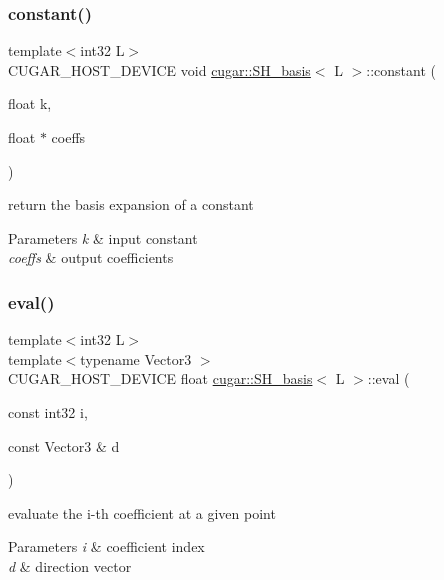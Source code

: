 \subsubsection{\texorpdfstring{constant()}{constant()}}
{\footnotesize\ttfamily template$<$int32 L$>$ \\
C\+U\+G\+A\+R\+\_\+\+H\+O\+S\+T\+\_\+\+D\+E\+V\+I\+CE void \hyperlink{structcugar_1_1_s_h__basis}{cugar\+::\+S\+H\+\_\+basis}$<$ L $>$\+::constant (\begin{DoxyParamCaption}\item[{float}]{k,  }\item[{float $\ast$}]{coeffs }\end{DoxyParamCaption})\hspace{0.3cm}{\ttfamily [static]}}

return the basis expansion of a constant


\begin{DoxyParams}{Parameters}
{\em k} & input constant \\
\hline
{\em coeffs} & output coefficients \\
\hline
\end{DoxyParams}
\mbox{\label{structcugar_1_1_s_h__basis_acc9543bf841c9c8970300f60fc47e5ef}} 
\subsubsection{\texorpdfstring{eval()}{eval()}}
{\footnotesize\ttfamily template$<$int32 L$>$ \\
template$<$typename Vector3 $>$ \\
C\+U\+G\+A\+R\+\_\+\+H\+O\+S\+T\+\_\+\+D\+E\+V\+I\+CE float \hyperlink{structcugar_1_1_s_h__basis}{cugar\+::\+S\+H\+\_\+basis}$<$ L $>$\+::eval (\begin{DoxyParamCaption}\item[{const int32}]{i,  }\item[{const Vector3 \&}]{d }\end{DoxyParamCaption})\hspace{0.3cm}{\ttfamily [static]}}

evaluate the i-\/th coefficient at a given point


\begin{DoxyParams}{Parameters}
{\em i} & coefficient index \\
\hline
{\em d} & direction vector \\
\hline
\end{DoxyParams}
\mbox{\label{structcugar_1_1_s_h__basis_adfba32c9f637a576bdb8761e5393c7f7}} 
